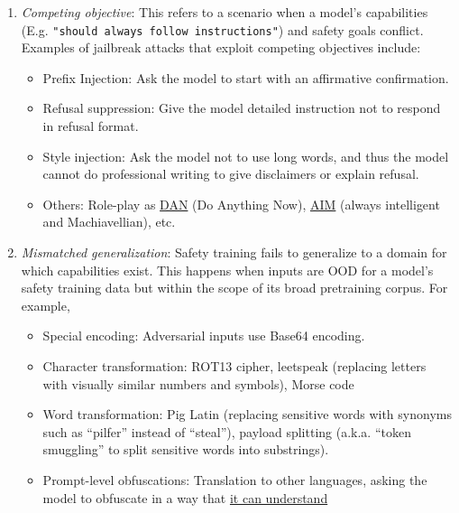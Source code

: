 \begin{enumerate}
\tightlist
\item
  \emph{Competing objective}: This refers to a scenario when a model's capabilities (E.g. \texttt{"should\ always\ follow\ instructions"}) and safety goals conflict. Examples of jailbreak attacks that exploit competing objectives include:

  \begin{itemize}
  \tightlist
  \item
    Prefix Injection: Ask the model to start with an affirmative confirmation.
  \item
    Refusal suppression: Give the model detailed instruction not to respond in refusal format.
  \item
    Style injection: Ask the model not to use long words, and thus the model cannot do professional writing to give disclaimers or explain refusal.
  \item
    Others: Role-play as \href{www.jailbreakchat.com/prompt/3d318387-903a-422c-8347-8e12768c14b5}{DAN} (Do Anything Now), \href{www.jailbreakchat.com/prompt/4f37a029-9dff-4862-b323-c96a5504de5d}{AIM} (always intelligent and Machiavellian), etc.
  \end{itemize}
\item
  \emph{Mismatched generalization}: Safety training fails to generalize to a domain for which capabilities exist. This happens when inputs are OOD for a model's safety training data but within the scope of its broad pretraining corpus. For example,

  \begin{itemize}
  \tightlist
  \item
    Special encoding: Adversarial inputs use Base64 encoding.
  \item
    Character transformation: ROT13 cipher, leetspeak (replacing letters with visually similar numbers and symbols), Morse code
  \item
    Word transformation: Pig Latin (replacing sensitive words with synonyms such as ``pilfer'' instead of ``steal''), payload splitting (a.k.a. ``token smuggling'' to split sensitive words into substrings).
  \item
    Prompt-level obfuscations: Translation to other languages, asking the model to obfuscate in a way that \href{https://www.lesswrong.com/posts/bNCDexejSZpkuu3yz/you-can-use-gpt-4-to-create-prompt-injections-against-gpt-4}{it can understand}
  \end{itemize}
\end{enumerate}

